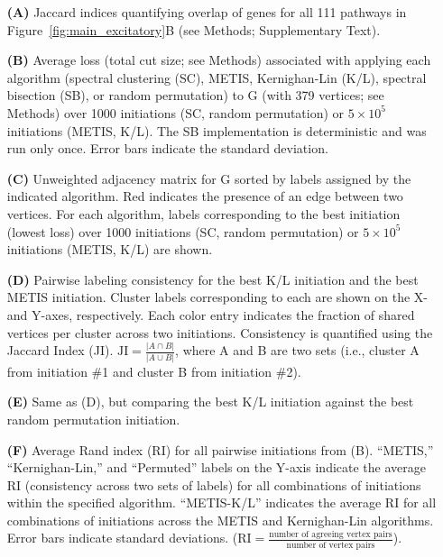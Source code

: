 \begin{itemize}
    \item[\textbf{(A)}] Jaccard indices quantifying overlap of genes for all 111 pathways in Figure~\ref{fig:main_excitatory}B (see Methods; Supplementary Text). 
    \item[\textbf{(B)}] Average loss (total cut size; see Methods) associated with applying each algorithm (spectral clustering (SC), METIS, Kernighan-Lin (K/L), spectral bisection (SB), or random permutation) to G (with 379 vertices; see Methods) over 1000 initiations (SC, random permutation) or $5 \times 10^5$ initiations (METIS, K/L). The SB implementation is deterministic and was run only once. Error bars indicate the standard deviation. 
    \item[\textbf{(C)}] Unweighted adjacency matrix for G sorted by labels assigned by the indicated algorithm. Red indicates the presence of an edge between two vertices. For each algorithm, labels corresponding to the best initiation (lowest loss) over 1000 initiations (SC, random permutation) or $5 \times 10^5$ initiations (METIS, K/L) are shown. 
    \item[\textbf{(D)}] Pairwise labeling consistency for the best K/L initiation and the best METIS initiation. Cluster labels corresponding to each are shown on the X- and Y-axes, respectively. Each color entry indicates the fraction of shared vertices per cluster across two initiations. Consistency is quantified using the Jaccard Index (JI). $\text{JI} = \frac{|A \cap B|}{|A \cup B|}$, where A and B are two sets (i.e., cluster A from initiation \#1 and cluster B from initiation \#2). 
    \item[\textbf{(E)}] Same as (D), but comparing the best K/L initiation against the best random permutation initiation. 
    \item[\textbf{(F)}] Average Rand index (RI) for all pairwise initiations from (B). “METIS,” “Kernighan-Lin,” and “Permuted” labels on the Y-axis indicate the average RI (consistency across two sets of labels) for all combinations of initiations within the specified algorithm. “METIS-K/L” indicates the average RI for all combinations of initiations across the METIS and Kernighan-Lin algorithms. Error bars indicate standard deviations. ($\text{RI} = \frac{\text{number of agreeing vertex pairs}}{\text{number of vertex pairs}}$).
\end{itemize}